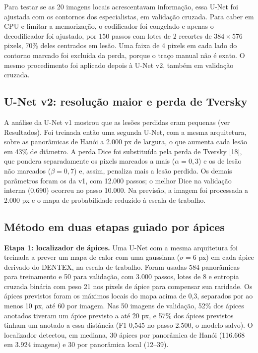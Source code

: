 \documentclass[twocolumn]{article}
\begin{document}
Para testar se as 20 imagens locais acrescentavam informação, essa U-Net foi ajustada com os contornos dos especialistas, em validação cruzada. Para caber em CPU e limitar a memorização, o codificador foi congelado e apenas o decodificador foi ajustado, por 150 passos com lotes de 2 recortes de $384 \times 576$ pixels, 70\% deles centrados em lesão. Uma faixa de 4 pixels em cada lado do contorno marcado foi excluída da perda, porque o traço manual não é exato. O mesmo procedimento foi aplicado depois à U-Net v2, também em validação cruzada.

\subsection{U-Net v2: resolução maior e perda de Tversky}

A análise da U-Net v1 mostrou que as lesões perdidas eram pequenas (ver Resultados). Foi treinada então uma segunda U-Net, com a mesma arquitetura, sobre as panorâmicas de Hanói a 2.000 px de largura, o que aumenta cada lesão em 43\% de diâmetro. A perda Dice foi substituída pela perda de Tversky [18], que pondera separadamente os pixels marcados a mais ($\alpha = 0{,}3$) e os de lesão não marcados ($\beta = 0{,}7$) e, assim, penaliza mais a lesão perdida. Os demais parâmetros foram os da v1, com 12.000 passos; o melhor Dice na validação interna (0,690) ocorreu no passo 10.000. Na previsão, a imagem foi processada a 2.000 px e o mapa de probabilidade reduzido à escala de trabalho.

\subsection{Método em duas etapas guiado por ápices}

\textbf{Etapa 1: localizador de ápices.} Uma U-Net com a mesma arquitetura foi treinada a prever um mapa de calor com uma gaussiana ($\sigma = 6$ px) em cada ápice derivado do DENTEX, na escala de trabalho. Foram usadas 584 panorâmicas para treinamento e 50 para validação, com 3.000 passos, lotes de 8 e entropia cruzada binária com peso 21 nos pixels de ápice para compensar sua raridade. Os ápices previstos foram os máximos locais do mapa acima de 0,3, separados por ao menos 10 px, até 60 por imagem. Nas 50 imagens de validação, 52\% dos ápices anotados tiveram um ápice previsto a até 20 px, e 57\% dos ápices previstos tinham um anotado a essa distância (F1 0,545 no passo 2.500, o modelo salvo). O localizador detectou, em mediana, 30 ápices por panorâmica de Hanói (116.668 em 3.924 imagens) e 30 por panorâmica local (12--39).
\end{document}

